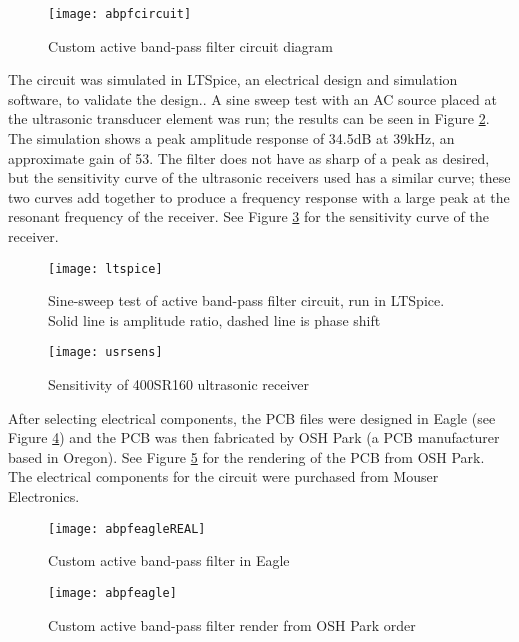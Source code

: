 \documentclass[12pt,a4paper]{report}
\begin{document}
\begin{figure}[!htbp]
	\centering
	\texttt{[image: abpfcircuit]}
	\caption{Custom active band-pass filter circuit diagram}
	\label{fig:abpfcircuit}
\end{figure}

The circuit was simulated in LTSpice, an electrical design and simulation software, to validate the design.. A sine sweep test with an AC source placed at the ultrasonic transducer element was run; the results can be seen in Figure \ref{fig:ltspice}. The simulation shows a peak amplitude response of 34.5dB at 39kHz, an approximate gain of 53. The filter does not have as sharp of a peak as desired, but the sensitivity curve of the ultrasonic receivers used has a similar curve; these two curves add together to produce a frequency response with a large peak at the resonant frequency of the receiver. See Figure \ref{fig:usrsens} for the sensitivity curve of the receiver.

\begin{figure}[htbp]
	\centering
	\texttt{[image: ltspice]}
	\caption{Sine-sweep test of active band-pass filter circuit, run in LTSpice. Solid line is amplitude ratio, dashed line is phase shift}
	\label{fig:ltspice}
\end{figure}

\begin{figure}[htbp]
	\centering
	\texttt{[image: usrsens]}
	\caption{Sensitivity of 400SR160 ultrasonic receiver \cite{400sr160}}
	\label{fig:usrsens}
\end{figure}

\pagebreak

After selecting electrical components, the PCB files were designed in Eagle (see Figure \ref{fig:abpfeagleREAL}) and the PCB was then fabricated by OSH Park (a PCB manufacturer based in Oregon). See Figure \ref{fig:abpfeagle} for the rendering of the PCB from OSH Park. The electrical components for the circuit were purchased from Mouser Electronics.

\begin{figure}[htbp]
	\centering
	\texttt{[image: abpfeagleREAL]}
	\caption{Custom active band-pass filter in Eagle}
	\label{fig:abpfeagleREAL}
\end{figure}

\begin{figure}[htbp]
	\centering
	\texttt{[image: abpfeagle]}
	\caption{Custom active band-pass filter render from OSH Park order}
	\label{fig:abpfeagle}
\end{figure}
\end{document}
